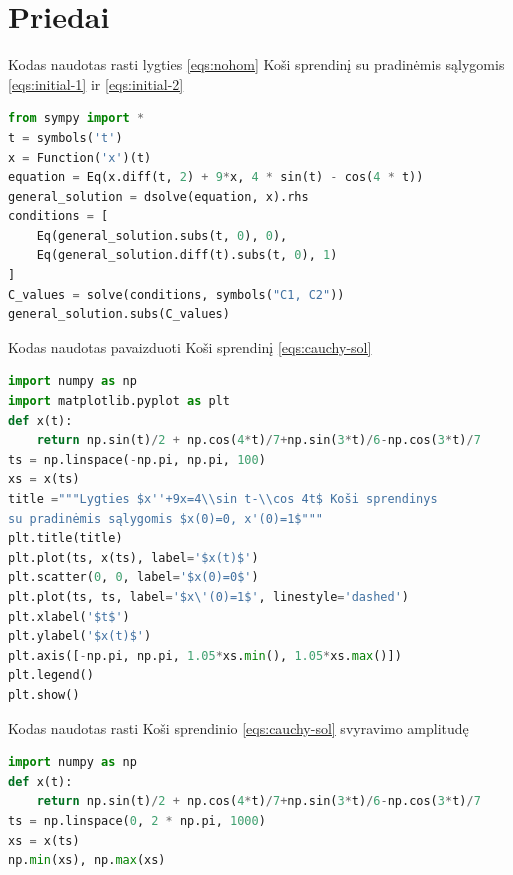 \documentclass[11pt]{article}
\begin{document}
\section{Priedai}
Kodas naudotas rasti lygties \eqref{eqs:nohom} Koši sprendinį su pradinėmis sąlygomis \eqref{eqs:initial-1} ir \eqref{eqs:initial-2}
\begin{lstlisting}[language=Python]
from sympy import *
t = symbols('t')
x = Function('x')(t)
equation = Eq(x.diff(t, 2) + 9*x, 4 * sin(t) - cos(4 * t))
general_solution = dsolve(equation, x).rhs
conditions = [
    Eq(general_solution.subs(t, 0), 0),
    Eq(general_solution.diff(t).subs(t, 0), 1)
]
C_values = solve(conditions, symbols("C1, C2"))
general_solution.subs(C_values)
\end{lstlisting}
\newpage
Kodas naudotas pavaizduoti Koši sprendinį \eqref{eqs:cauchy-sol}
\begin{lstlisting}[language=Python]
import numpy as np
import matplotlib.pyplot as plt
def x(t):
    return np.sin(t)/2 + np.cos(4*t)/7+np.sin(3*t)/6-np.cos(3*t)/7
ts = np.linspace(-np.pi, np.pi, 100)
xs = x(ts)
title ="""Lygties $x''+9x=4\\sin t-\\cos 4t$ Koši sprendinys
su pradinėmis sąlygomis $x(0)=0, x'(0)=1$"""
plt.title(title)
plt.plot(ts, x(ts), label='$x(t)$')
plt.scatter(0, 0, label='$x(0)=0$')
plt.plot(ts, ts, label='$x\'(0)=1$', linestyle='dashed')
plt.xlabel('$t$')
plt.ylabel('$x(t)$')
plt.axis([-np.pi, np.pi, 1.05*xs.min(), 1.05*xs.max()])
plt.legend()
plt.show()
\end{lstlisting}
Kodas naudotas rasti Koši sprendinio \eqref{eqs:cauchy-sol} svyravimo amplitudę
\begin{lstlisting}[language=Python]
import numpy as np
def x(t):
    return np.sin(t)/2 + np.cos(4*t)/7+np.sin(3*t)/6-np.cos(3*t)/7
ts = np.linspace(0, 2 * np.pi, 1000)
xs = x(ts)
np.min(xs), np.max(xs)
\end{lstlisting}
\end{document}
